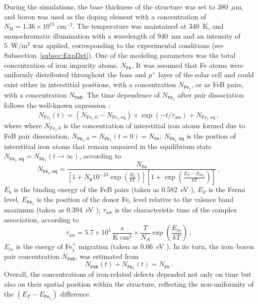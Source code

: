 \documentclass[10pt]{iopart}
\begin{document}
During the simulations, the base thickness of the structure was set to 380~$\mu$m, 
and boron was used as the doping element with a concentration of $N_\mathrm{B} = 1.36 \times 10^{15}$ cm$^{-3}$.
The temperature was maintained at 340~K, and monochromatic illumination with a wavelength of  940~nm and an intensity of 5~W/m$^{2}$ 
was applied, corresponding to the experimental conditions (see Subsection~\ref{subsec:ExpDet}).
One of the modeling parameters was the total concentration of iron impurity atoms, $N_\mathtt{Fe}$.
It was assumed that Fe atoms were uniformly distributed throughout the base and $p^+$ layer of the solar cell 
and could exist either in interstitial positions, with a concentration $N_\mathtt{Fe_i}$, or as FeB pairs, with a concentration $N_\mathtt{FeB}$.
The time dependence of $N_\mathtt{Fe_i}$ after pair dissociation follows the well-known expression \cite{MurphyJAP2011, Wijaranakula}:
\begin{equation}
\label{eqNFet}
N_\mathrm{Fe_i}(t)=(N_\mathrm{Fe_i,0}-N_\mathrm{Fe_i,eq})\times
\exp(-t/\tau_\mathrm{ass})+N_\mathrm{Fe_i,eq}\,,
\end{equation}
where
where $N_\mathrm{Fe_i,0}$ is the concentration of interstitial iron atoms formed due to FeB pair dissosiation, 
$N_\mathtt{Fe_i,0} = N_\mathtt{Fe_i}(t=0) = N_\mathtt{Fe}$;
$N_\mathtt{Fe_i,eq}$ is the portion of interstitial iron atoms that remain unpaired in the equilibrium state 
$N_\mathtt{Fe_i,eq}=N_\mathtt{Fe_i}(t \rightarrow \infty)$,
according to \cite{MurphyJAP2011, Wijaranakula}
\begin{equation}\label{eqFeieq}
  N_\mathtt{Fe_i,eq}=\frac{N_\mathtt{Fe}}{\left[1+N_\mathtt{B}10^{-23}\exp\left(\frac{E_b}{kT}\right)\right]
  \left[1+\exp\left(\frac{E_F-E_\mathtt{Fe_i}}{kT}\right)\right]}\,,
\end{equation}
$E_b$ is the binding energy of the FeB pairs (taken as 0.582~eV \cite{Wijaranakula}),
$E_F$ is the Fermi level,
$E_\mathtt{Fe_i}$ is the position of the donor Fe$_i$ level relative to the valence band maximum
(taken as 0.394~eV \cite{FeBAssJAP2014});
$\tau_\mathrm{ass}$ is the characteristic time of the complex association,
according to \cite{FeBKin2019,FeBAssJAP2014,FeBAssSST2011}
\begin{equation}
\label{eqTass}
\tau_\mathrm{ass}=5.7\times10^5\,\frac{\mathrm{s}}{\mathrm{K}\;\mathrm{cm}^3}\times\frac{T}{N_A}\exp\left(\frac{E_m}{kT}\right)\,,
\end{equation}
$E_m$ is the energy of Fe$_\mathtt{i}^+$ migration (taken as 0.66~eV \cite{FeBAssJAP2014,FeBKin2019,FeBAssSST2011}).
In its turn, the iron–boron pair concentration $N_\mathtt{FeB}$, was estimated from
\begin{equation}\label{eqNFeB}
  N_\mathtt{FeB}(t)+N_\mathtt{Fe_i}(t)=N_\mathtt{Fe}\,.
\end{equation}
Overall, the concentrations of iron-related defects depended not only on time but
also on their spatial position within the structure, reflecting the non-uniformity of the $(E_F-E_\mathtt{Fe_i})$ difference.
\end{document}
